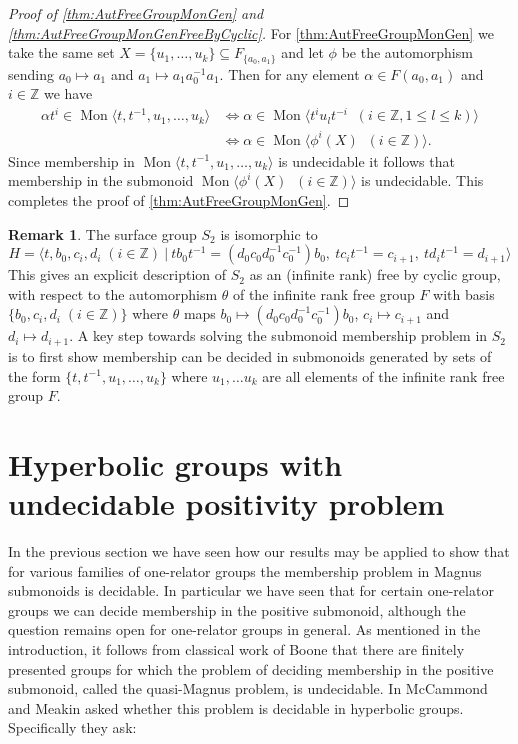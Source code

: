 \documentclass[11pt]{amsart}
\newcommand{\Mgen}[1]{\operatorname{Mon}\bigl\langle #1 \bigr\rangle}
\newcommand{\Gpres}[2]{\bigl\langle #1\:|\:#2 \bigr\rangle}
\newcommand{\Z}{\mathbb{Z}}
\theoremstyle{plain}
\theoremstyle{definition}
\newtheorem{remark}[theorem]{Remark}
\begin{document}
\begin{proof}[Proof of \cref{thm:AutFreeGroupMonGen} and \cref{thm:AutFreeGroupMonGenFreeByCyclic}]
For \cref{thm:AutFreeGroupMonGen} we take the same set $X = \{u_1, \ldots, u_k \} \subseteq F_{\{ a_0,a_1 \}}$ and let $\phi$ be the automorphism sending $a_0 \mapsto a_1$ and $a_1 \mapsto a_1 a_0^{-1} a_1$. Then for any element $\alpha \in F(a_0,a_1)$ and $i \in \Z$ we have 
\begin{align*} 
\alpha t^i \in \Mgen{t, t^{-1}, u_1, \ldots, u_k }   
& \Leftrightarrow 
\alpha \in \Mgen{t^i u_l t^{-i} \; \; (i \in \Z, 1 \leq l \leq k) } \\
& \Leftrightarrow 
\alpha \in \Mgen{\phi^i(X) \; \; (i \in \Z) }. 
\end{align*}
Since membership in $\Mgen{t, t^{-1}, u_1, \ldots, u_k }$ is undecidable it follows that membership in the submonoid $\Mgen{\phi^i(X) \; \; (i \in \Z) }$ is undecidable. This completes the proof of \cref{thm:AutFreeGroupMonGen}. \end{proof}

\begin{remark} The surface group $S_2$ is isomorphic to 
\[
H = \Gpres{t,b_0,c_i,d_i \; (i \in \Z)}{t b_0 t^{-1} = (d_0c_0d_0^{-1}c_0^{-1})b_0, \ tc_i t^{-1} = c_{i+1}, \ td_i t^{-1} = d_{i+1}  }
\]
This gives an explicit description of $S_2$ as an (infinite rank) free by cyclic group, with respect to the automorphism $\theta$ of the infinite rank free group $F$ with basis $\{ b_0,c_i,d_i \; (i \in \Z) \} $ where $\theta$ maps $b_0 \mapsto (d_0c_0d_0^{-1}c_0^{-1})b_0$, $c_i \mapsto c_{i+1}$ and $d_i \mapsto d_{i+1}$. A key step towards solving the submonoid membership problem in $S_2$ is to first show membership can be decided in submonoids generated by sets of the form $\{t, t^{-1}, u_1, \ldots, u_k \}$ where $u_1, \ldots u_k$ are all elements of the infinite rank free group $F$. \end{remark}


\section{Hyperbolic groups with undecidable positivity problem}\label{sec:hyperbolic}
In the previous section we have seen how our results may be applied to show that for various families of one-relator groups the membership problem in Magnus submonoids is decidable. In particular we have seen that for certain one-relator groups we can decide membership in the positive submonoid, although the question remains open for one-relator groups in general. 
As mentioned in the introduction, it follows from classical work of Boone that there are finitely presented groups for which the problem of deciding membership in the positive submonoid,   
called the quasi-Magnus problem, is undecidable. 
In \cite{McCammondMeakin} McCammond and Meakin asked whether this problem is decidable in hyperbolic groups. Specifically they ask: 
\end{document}
